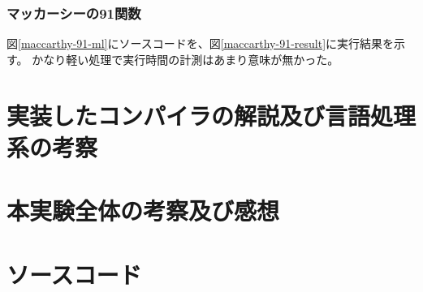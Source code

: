 \documentclass[report]{jlreq}
\begin{document}
    \subsection{マッカーシーの91関数}
      図\ref{maccarthy-91-ml}にソースコードを、図\ref{maccarthy-91-result}に実行結果を示す。
      かなり軽い処理で実行時間の計測はあまり意味が無かった。
      
      
  \chapter{実装したコンパイラの解説及び言語処理系の考察}
  \chapter{本実験全体の考察及び感想}
  \chapter{ソースコード}
\end{document}
